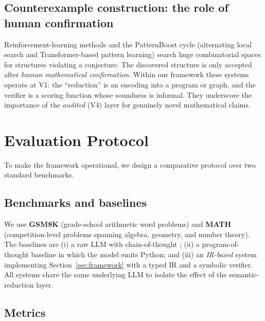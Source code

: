 \documentclass[11pt,a4paper]{article}
\theoremstyle{definition}
\theoremstyle{plain}
\begin{document}
\subsection{Counterexample construction: the role of human confirmation}
\label{sec:case-counter}

Reinforcement-learning methods \cite{wagner2021} and the PatternBoost cycle (alternating local search
and Transformer-based pattern learning) search huge combinatorial spaces for structures violating a
conjecture. The discovered structure is only accepted after \emph{human mathematical confirmation}.
Within our framework these systems operate at V1: the ``reduction'' is an encoding into a program or
graph, and the verifier is a scoring function whose soundness is informal. They underscore the
importance of the \emph{audited} (V4) layer for genuinely novel mathematical claims.

\section{Evaluation Protocol}
\label{sec:experiments}

To make the framework operational, we design a comparative protocol over two standard benchmarks.

\subsection{Benchmarks and baselines}
\label{sec:benchmarks}

We use \textbf{GSM8K} \cite{cobbe2021} (grade-school arithmetic word problems) and \textbf{MATH}
\cite{hendrycks2021} (competition-level problems spanning algebra, geometry, and number theory). The
baselines are (i) a raw LLM with chain-of-thought \cite{wei2022}; (ii) a program-of-thought baseline in
which the model emits Python; and (iii) an \emph{IR-based} system implementing
Section~\ref{sec:framework} with a typed IR and a symbolic verifier. All systems share the same
underlying LLM to isolate the effect of the semantic-reduction layer.

\subsection{Metrics}
\label{sec:metrics}
\end{document}
